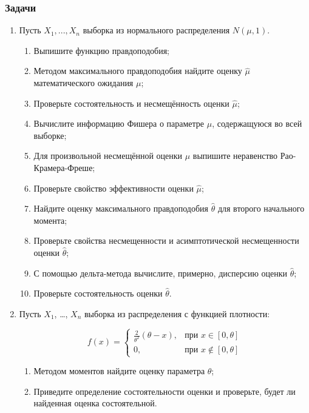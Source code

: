 \subsubsection{Задачи}

\begin{enumerate}[resume]

	\item Пусть $X_{1},...,X_{n}$ выборка из нормального распределения $N(\mu,1)$.
	\begin{enumerate}
		\item Выпишите функцию правдоподобия;
		\item Методом максимального правдоподобия найдите оценку $\hat{\mu}$ математического ожидания $\mu$;

		\item Проверьте состоятельность и несмещённость оценки $\hat{\mu}$;
		\item Вычислите информацию Фишера о параметре $\mu$, содержащуюся во всей выборке;
		\item Для произвольной несмещённой оценки $\mu$ выпишите неравенство Рао-Крамера-Фреше;
		\item Проверьте свойство эффективности оценки $\hat{\mu}$;
		\item Найдите оценку максимального правдоподобия $\hat{\theta}$ для второго начального момента;
	\item Проверьте свойства несмещенности и асимптотической несмещенности оценки $\hat{\theta}$;
	\item С помощью дельта-метода вычислите, примерно, дисперсию оценки $\hat{\theta}$;
	\item Проверьте состоятельность оценки $\hat{\theta}$.
\end{enumerate}

 	\item Пусть $X_{1}$, \ldots, $X_{n}$ выборка из распределения с функцией плотности:

\[
f(x)=\begin{cases}
 		\frac{2}{\theta^2}(\theta-x),&\text{при }x\in[0,\theta]\\
 		0,&\text{при }x\notin[0,\theta]
 		\end{cases}
\]


 \begin{enumerate}
 	\item Методом моментов найдите оценку параметра $\theta$;
 	\item Приведите определение состоятельности оценки и проверьте, будет ли найденная оценка состоятельной.
 \end{enumerate}


\end{enumerate}
